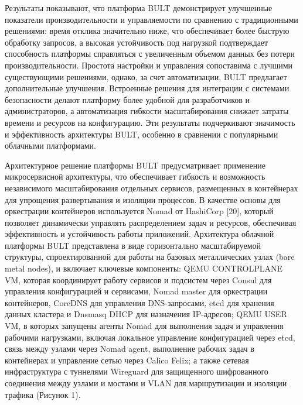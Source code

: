 \begin{multicols}{2}
Результаты показывают, что платформа BULT демонстрирует улучшенные
показатели производительности и управляемости по сравнению с
традиционными решениями: время отклика значительно ниже, что
обеспечивает более быструю обработку запросов, а высокая устойчивость
под нагрузкой подтверждает способность платформы справляться с
увеличенным объемом данных без потери производительности. Простота
настройки и управления сопоставима с лучшими существующими решениями,
однако, за счет автоматизации, BULT предлагает дополнительные улучшения.
Встроенные решения для интеграции с системами безопасности делают
платформу более удобной для разработчиков и администраторов, а
автоматизация гибкости масштабирования снижает затраты времени и
ресурсов на конфигурацию. Эти результаты подчеркивают значимость и
эффективность архитектуры BULT, особенно в сравнении с популярными
облачными платформами.

Архитектурное решение платформы BULT предусматривает применение
микросервисной архитектуры, что обеспечивает гибкость и возможность
независимого масштабирования отдельных сервисов, размещенных в
контейнерах для упрощения развертывания и изоляции процессов. В качестве
основы для оркестрации контейнеров используется Nomad от HashiCorp
{[}20{]}, который позволяет динамически управлять распределением задач и
ресурсов, обеспечивая эффективность и устойчивость работы приложений.
Архитектура облачной платформы BULT представлена в виде горизонтально
масштабируемой структуры, спроектированной для работы на базовых
металлических узлах (bare metal nodes), и включает ключевые компоненты:
QEMU CONTROLPLANE VM, которая координирует работу сервисов и подсистем
через Consul для управления конфигурацией и сервисами, Nomad master для
оркестрации контейнеров, CoreDNS для управления DNS-запросами, etcd для
хранения данных кластера и Dnsmasq DHCP для назначения IP-адресов; QEMU
USER VM, в которых запущены агенты Nomad для выполнения задач и
управления рабочими нагрузками, включая локальное управление
конфигурацией через etcd, связь между узлами через Nomad agent,
выполнение рабочих задач в контейнерах и управление сетью через Calico
Felix; а также сетевая инфраструктура с туннелями Wireguard для
защищенного шифрованного соединения между узлами и мостами и VLAN для
маршрутизации и изоляции трафика (Рисунок 1).
\end{multicols}

